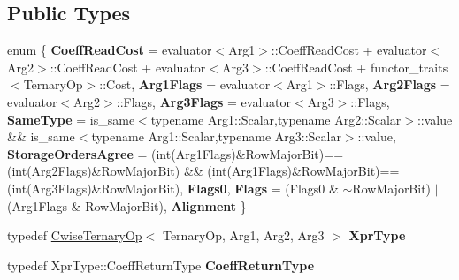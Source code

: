 \subsection*{Public Types}
\begin{DoxyCompactItemize}
\item 
\mbox{\label{struct_eigen_1_1internal_1_1ternary__evaluator_3_01_cwise_ternary_op_3_01_ternary_op_00_01_arg1_daf42d21bcfee99cfa54e03ffa9506fc_a50e14f961606504d61926ac88347dea3}} 
enum \{ \newline
{\bfseries Coeff\+Read\+Cost} = evaluator$<$Arg1$>$\+::Coeff\+Read\+Cost + evaluator$<$Arg2$>$\+::Coeff\+Read\+Cost + evaluator$<$Arg3$>$\+::Coeff\+Read\+Cost + functor\+\_\+traits$<$Ternary\+Op$>$\+::Cost, 
{\bfseries Arg1\+Flags} = evaluator$<$Arg1$>$\+::Flags, 
{\bfseries Arg2\+Flags} = evaluator$<$Arg2$>$\+::Flags, 
{\bfseries Arg3\+Flags} = evaluator$<$Arg3$>$\+::Flags, 
\newline
{\bfseries Same\+Type} = is\+\_\+same$<$typename Arg1\+::Scalar,typename Arg2\+::Scalar$>$\+::value \&\& is\+\_\+same$<$typename Arg1\+::Scalar,typename Arg3\+::Scalar$>$\+::value, 
{\bfseries Storage\+Orders\+Agree} = (int(Arg1\+Flags)\&Row\+Major\+Bit)==(int(Arg2\+Flags)\&Row\+Major\+Bit) \&\& (int(Arg1\+Flags)\&Row\+Major\+Bit)==(int(Arg3\+Flags)\&Row\+Major\+Bit), 
{\bfseries Flags0}, 
{\bfseries Flags} = (Flags0 \& $\sim$\+Row\+Major\+Bit) $\vert$ (Arg1\+Flags \& Row\+Major\+Bit), 
\newline
{\bfseries Alignment}
 \}
\item 
\mbox{\label{struct_eigen_1_1internal_1_1ternary__evaluator_3_01_cwise_ternary_op_3_01_ternary_op_00_01_arg1_daf42d21bcfee99cfa54e03ffa9506fc_a0caf670eb51af4cb632e03e3b7a910f9}} 
typedef \mbox{\hyperlink{class_eigen_1_1_cwise_ternary_op}{Cwise\+Ternary\+Op}}$<$ Ternary\+Op, Arg1, Arg2, Arg3 $>$ {\bfseries Xpr\+Type}
\item 
\mbox{\label{struct_eigen_1_1internal_1_1ternary__evaluator_3_01_cwise_ternary_op_3_01_ternary_op_00_01_arg1_daf42d21bcfee99cfa54e03ffa9506fc_a73724cae680d9ce3cdbe1dd4427274e6}} 
typedef Xpr\+Type\+::\+Coeff\+Return\+Type {\bfseries Coeff\+Return\+Type}
\end{DoxyCompactItemize}
